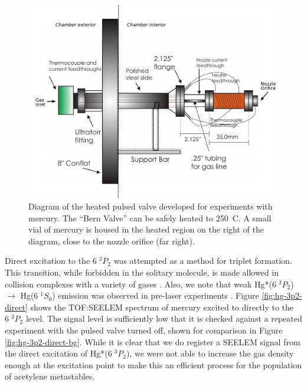 \documentclass[12pt]{mitthesis}
\begin{document}
\begin{figure}
  \caption{Diagram of the heated pulsed valve developed for
    experiments with mercury.  The ``Bern Valve'' can be safely heated
    to 250\degrees\ C.  A small vial of mercury is housed in the
    heated region on the right of the diagram, close to the nozzle
    orifice (far right).}
  \label{fig:bern-diagram}
  \centering
  \includegraphics[width=6in]{bern-diagram.pdf}
\end{figure}



Direct excitation to the $6 \; ^3P_2$ was attempted as a method for
triplet formation.  This transition, while forbidden in the solitary
molecule, is made allowed in collision complexes with a variety of
gases \cite{kurosawa98, amano98}.  Also, we note that weak Hg*($6 \; ^3P_2$)
$\rightarrow$ Hg($6 \; ^1S_0$) emission was observed in pre-laser
experiments \cite{mrozowski45}.  Figure \ref{fig:hg-3p2-direct} shows
the TOF:SEELEM spectrum of mercury excited to directly to the $6 \;
^3P_2$ level.  The signal level is sufficiently low that it is checked
against a repeated experiment with the pulsed valve turned off, shown
for comparison in Figure \ref{fig:hg-3p2-direct-bg}.  While it is
clear that we do register a SEELEM signal from the direct excitation
of Hg*($6 \; ^3P_2$), we were not able to increase the gas density
enough at the excitation point to make this an efficient process for
the population of acetylene metastables.
\end{document}
